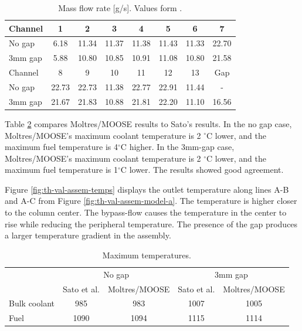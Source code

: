 \begin{table}[htbp!]
\centering
  \caption{Mass flow rate [g/s]. Values form \cite{sato_computational_2010}.}
  \label{tab:th-val-assem-massflow}
  \begin{tabular}{l|ccccccc}
\toprule
Channel & 1 & 2 & 3 & 4 & 5 & 6 & 7 \\
\midrule
No gap  & 6.18 & 11.34 & 11.37 & 11.38 & 11.43 & 11.33 & 22.70 \\
3mm gap & 5.88 & 10.80 & 10.85 & 10.91 & 11.08 & 10.80 & 21.58 \\
\midrule
Channel & 8 & 9 & 10 & 11 & 12 & 13 & Gap \\
\midrule
No gap  & 22.73 & 22.73 & 11.38 & 22.77 & 22.91 & 11.44 & -     \\
3mm gap & 21.67 & 21.83 & 10.88 & 21.81 & 22.20 & 11.10 & 16.56 \\
\bottomrule
\end{tabular}
\end{table}

Table \ref{tab:th-val-assem-results} compares Moltres/MOOSE results to Sato's results.
In the no gap case, Moltres/MOOSE's maximum coolant temperature is 2 $^{\circ}$C lower, and the maximum fuel temperature is 4$^{\circ}$C higher.
In the 3mm-gap case, Moltres/MOOSE's maximum coolant temperature is 2 $^{\circ}$C lower, and the maximum fuel temperature is 1$^{\circ}$C lower.
The results showed good agreement.

Figure \ref{fig:th-val-assem-temps} displays the outlet temperature along lines A-B and A-C from Figure \ref{fig:th-val-assem-model-a}.
The temperature is higher closer to the column center.
The bypass-flow causes the temperature in the center to rise while reducing the peripheral temperature.
The presence of the gap produces a larger temperature gradient in the assembly.

\begin{table}[htbp!]
  \centering
  \caption{Maximum temperatures.}
  \label{tab:th-val-assem-results}
\begin{tabular}{l|c|c|c|c}
\toprule
        & \multicolumn{2}{c|}{No gap} & \multicolumn{2}{c}{3mm gap} \\ \cline{2-5}
        & Sato et al. & Moltres/MOOSE & Sato et al. & Moltres/MOOSE \\ \midrule
Bulk coolant & 985     & 983               & 1007     & 1005             \\  
Fuel    & 1090    & 1094              & 1115     & 1114             \\
\bottomrule
\end{tabular}
\end{table}

